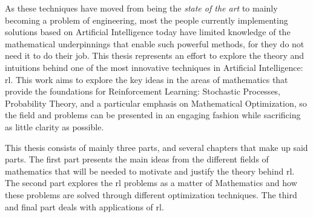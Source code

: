 As these techniques have moved from being the \textit{state of the art} to
mainly becoming a problem of engineering, most the people currently implementing
solutions based on Artificial Intelligence today have limited knowledge of the
mathematical underpinnings that enable such powerful methods, for they do not 
need it to do their job. This thesis represents an effort to explore the theory
and intuitions behind one of the most innovative techniques in Artificial
Intelligence: \acf{rl}. This work aims to explore the key ideas in
the areas of mathematics that provide the foundations for Reinforcement
Learning: Stochastic Processes, Probability Theory, and a particular emphasis on
Mathematical Optimization, so the field and problems can be presented in an
engaging fashion while sacrificing as little clarity as possible.

This thesis consists of mainly three parts, and several chapters that make up
said parts. The first part presents the main ideas from the different fields of
mathematics that will be needed to motivate and justify the theory behind
\ac{rl}. The second part explores the \ac{rl}
problems as a matter of Mathematics and how these problems are solved through
different optimization techniques. The third and final part deals with
applications of \ac{rl}.
